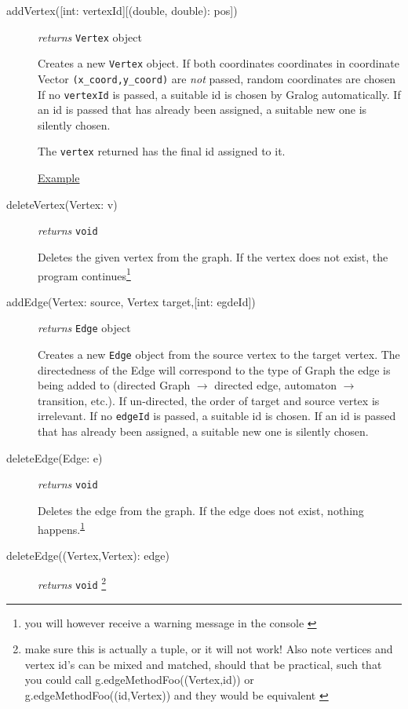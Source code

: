 \documentclass{article}
\newlength\q
\begin{document}
\begin{description}
\item[addVertex({[int: vertexId]}{[(double, double): pos]})]\emph{returns}
  \texttt{Vertex} object

  Creates a new \texttt{Vertex} object. If both coordinates coordinates in coordinate Vector \texttt{(x\_coord,y\_coord)} are \textit{not} passed,
  random coordinates are chosen
  If no \texttt{vertexId} is passed, a suitable id is
  chosen by Gralog automatically. If an id is passed that has already
  been assigned, a suitable new one is silently chosen.
  
  The \texttt{vertex} returned has the final id assigned to it.
  
  \hyperref[addVertexExample]{Example}

  
\item[deleteVertex(Vertex: v)] \emph{returns} \texttt{void}

Deletes the given vertex from the graph. If the vertex does not exist, the program continues\footnote{you will however receive a warning message in the console \label{deleteVertexWarning}}


\item[addEdge(Vertex: source, Vertex target,{[int: egdeId]})] \emph{returns} \texttt{Edge} object


Creates a new \texttt{Edge} object from the source vertex to the
target vertex. The directedness of the Edge will correspond to the type of Graph the edge is being added to (directed Graph $\to$ directed edge, automaton $\to$ transition, etc.). If un-directed, the
order of target and source vertex is irrelevant. If no \texttt{edgeId}
is passed, a suitable id is chosen. If an id is passed that has
already been assigned, a suitable new one is silently chosen.


\item[deleteEdge(Edge: e)] \emph{returns} \texttt{void}

Deletes the edge from the graph. If the edge does not exist, nothing
happens.\textsuperscript{\ref{deleteVertexWarning}}


\item[deleteEdge((Vertex,Vertex): edge)] \emph{returns}
  \texttt{void} \footnote{make sure this is actually a tuple, or it will not work! Also note vertices and vertex id's can be mixed and matched, should that be practical, such that you could call g.edgeMethodFoo((Vertex,id)) or g.edgeMethodFoo((id,Vertex)) and they would be equivalent \label{makeSureATupleWarning1}}


\end{description}
\end{document}
